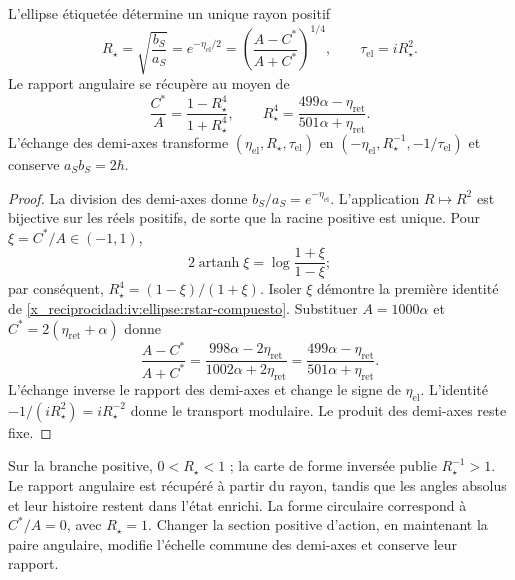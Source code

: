 \begin{proposition}
\label{x_reciprocidad:iv:ellipse:radio-prop}
L’ellipse étiquetée détermine un unique rayon positif
\begin{equation}
 R_\star=\sqrt{\frac{b_S}{a_S}}
 =e^{-\eta_{\mathrm{el}}/2}
 =\left(\frac{A-C^*}{A+C^*}\right)^{1/4},
 \qquad \tau_{\mathrm{el}}=iR_\star^2.
 \label{x_reciprocidad:iv:ellipse:rstar}
\end{equation}
Le rapport angulaire se récupère au moyen de
\begin{equation}
 \frac{C^*}{A}=\frac{1-R_\star^4}{1+R_\star^4},
 \qquad
 R_\star^4=
 \frac{499\alpha-\eta_{\mathrm{ret}}}
      {501\alpha+\eta_{\mathrm{ret}}}.
 \label{x_reciprocidad:iv:ellipse:rstar-compuesto}
\end{equation}
L’échange des demi-axes transforme
\((\eta_{\mathrm{el}},R_\star,\tau_{\mathrm{el}})\) en
\((-\eta_{\mathrm{el}},R_\star^{-1},-1/\tau_{\mathrm{el}})\)
et conserve \(a_Sb_S=2\hbar\).
\end{proposition}
\begin{proof}
La division des demi-axes donne \(b_S/a_S=e^{-\eta_{\mathrm{el}}}\).
L’application \(R\mapsto R^2\) est bijective sur les réels
positifs, de sorte que la racine positive est unique.
Pour \(\xi=C^*/A\in(-1,1)\),
\[
 2\operatorname{artanh}\xi
 =\log\frac{1+\xi}{1-\xi};
\]
par conséquent, \(R_\star^4=(1-\xi)/(1+\xi)\).
Isoler \(\xi\) démontre la première identité de
\eqref{x_reciprocidad:iv:ellipse:rstar-compuesto}. Substituer
\(A=1000\alpha\) et
\(C^*=2(\eta_{\mathrm{ret}}+\alpha)\) donne
\[
 \frac{A-C^*}{A+C^*}
 =\frac{998\alpha-2\eta_{\mathrm{ret}}}
        {1002\alpha+2\eta_{\mathrm{ret}}}
 =\frac{499\alpha-\eta_{\mathrm{ret}}}
        {501\alpha+\eta_{\mathrm{ret}}}.
\]
L’échange inverse le rapport des demi-axes et change le
signe de \(\eta_{\mathrm{el}}\). L’identité
\(-1/(iR_\star^2)=iR_\star^{-2}\) donne le transport
modulaire. Le produit des demi-axes reste fixe.
\end{proof}

Sur la branche positive, \(0<R_\star<1\) ; la carte de forme
inversée publie \(R_\star^{-1}>1\). Le rapport angulaire
est récupéré à partir du rayon, tandis que les angles absolus
et leur histoire restent dans l’état enrichi.
La forme circulaire correspond à \(C^*/A=0\), avec
\(R_\star=1\). Changer la section positive d’action,
en maintenant la paire angulaire, modifie l’échelle commune des
demi-axes et conserve leur rapport.

